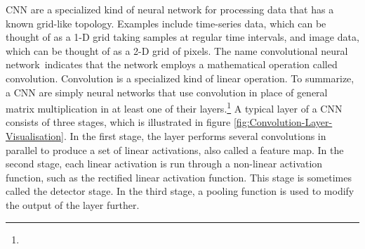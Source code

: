 \gls{CNN} are a specialized kind of neural network for processing data that has a known grid-like topology. Examples include time-series data, which can be thought of as a 1-D grid taking samples at regular time intervals, and image data, which can be thought of as a 2-D grid of pixels. The name \flqq convolutional neural network\frqq \ indicates that the network employs a mathematical operation called convolution. Convolution is a specialized kind of linear operation. To summarize, a \gls{CNN} are simply neural networks that use convolution in place of general matrix multiplication in at least one of their layers.\footnote{}
\newline
\newline
A typical layer of a \gls{CNN} consists of three stages, which is illustrated in figure \ref{fig:Convolution-Layer-Visualisation}. In the first stage, the layer performs several convolutions in parallel to produce a set of linear activations, also called a feature map. In the second stage, each linear activation is run through a non-linear activation function, such as the rectified linear activation function. This stage is sometimes called the detector stage. In the third stage, a pooling function is used to modify the output of the layer further.

